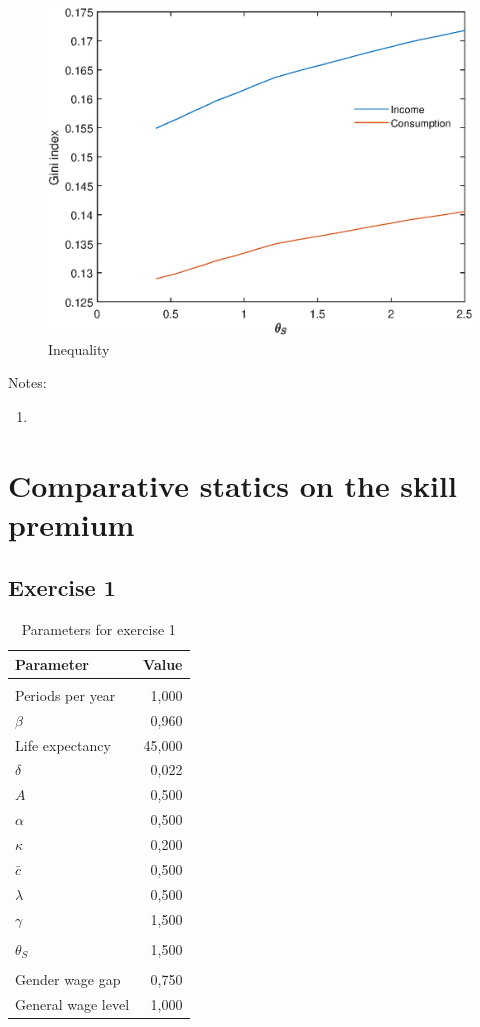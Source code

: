 \documentclass[12pt]{article}
\begin{document}
\begin{figure}
	\centering
	\caption{Inequality}
	\includegraphics{Graphs/ineq_theta_S_ex1.eps}
\end{figure}

Notes:

\begin{enumerate}
	\item 
\end{enumerate}

\clearpage

\section{Comparative statics on the skill premium}

\subsection{Exercise 1}

\begin{table}[htbp]
	\centering
	\caption{Parameters for exercise 1}
	\begin{tabular}{lr}
		\toprule
		Parameter & \multicolumn{1}{l}{Value} \\
		\midrule
		&  \\
		Periods per year & 1,000 \\
		$\beta$ & 0,960 \\
		Life expectancy & 45,000 \\
		$\delta$ & 0,022 \\
		$A$ & 0,500 \\
		$\alpha$ & 0,500 \\
		$\kappa$ & 0,200 \\
		$\bar {c}$ & 0,500 \\
		$\lambda$ & 0,500 \\
		$\gamma$ & 1,500 \\
		&  \\
		$\theta_S$ & 1,500 \\
		&  \\
		Gender wage gap & 0,750 \\
		General wage level & 1,000 \\
		\bottomrule
	\end{tabular}
\end{table}
\end{document}
